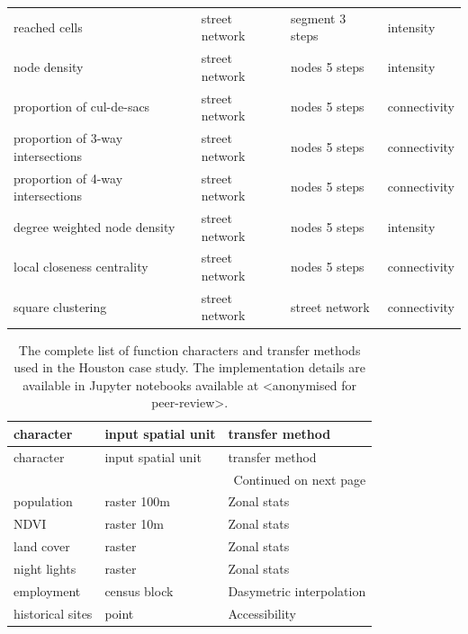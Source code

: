 \begin{longtable}{p{5cm}p{4cm}p{4cm}l}
                           reached cells &                  street network &            segment 3 steps &    intensity \\
                            node density &                  street network &              nodes 5 steps &    intensity \\
               proportion of cul-de-sacs &                  street network &              nodes 5 steps & connectivity \\
       proportion of 3-way intersections &                  street network &              nodes 5 steps & connectivity \\
       proportion of 4-way intersections &                  street network &              nodes 5 steps & connectivity \\
            degree weighted node density &                  street network &              nodes 5 steps &    intensity \\
              local closeness centrality &                  street network &              nodes 5 steps & connectivity \\
                       square clustering &                  street network &             street network & connectivity \\
\end{longtable}

\begin{longtable}{p{5cm}p{3cm}p{5cm}}
    \caption{The complete list of function characters and transfer methods used in the Houston case study. The implementation details are available
    in Jupyter notebooks available at <anonymised for peer-review>.}
    \label{tab:fn_hou} \\
    \toprule
                                             character & input spatial unit &                                    transfer method \\
    \midrule
    \endfirsthead

    \toprule
                                             character & input spatial unit &                                    transfer method \\
    \midrule
    \endhead
    \midrule
    \multicolumn{3}{r}{{Continued on next page}} \\
    \midrule
    \endfoot

    \bottomrule
    \endlastfoot
    population &  raster 100m &              Zonal stats \\
          NDVI &   raster 10m &              Zonal stats \\
    land cover &       raster &              Zonal stats \\
  night lights &       raster &              Zonal stats \\
    employment & census block & Dasymetric interpolation \\
historical sites &        point &            Accessibility \\
\end{longtable}


